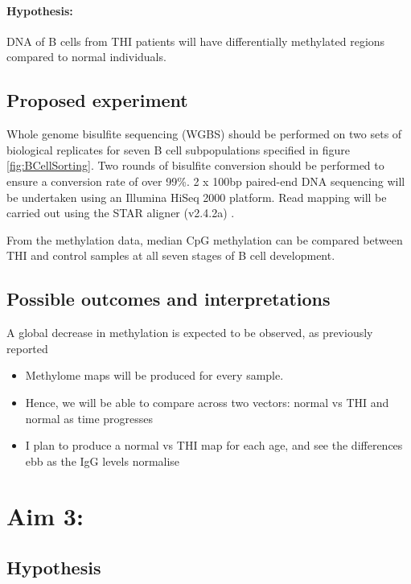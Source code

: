 \documentclass[12pt]{article}
\begin{document}
		\paragraph{Hypothesis:} DNA of B cells from THI patients will have differentially methylated regions compared to normal individuals.
		
		\subsection{Proposed experiment}
		
		Whole genome bisulfite sequencing (WGBS) should be performed on two sets of biological replicates for seven B cell subpopulations specified in figure \ref{fig:BCellSorting}. 
		Two rounds of bisulfite conversion should be performed to ensure a conversion rate of over 99\%.
		2 x 100bp paired-end DNA sequencing will be undertaken using an Illumina HiSeq 2000 platform. 
		Read mapping will be carried out using the STAR aligner (v2.4.2a) \citep{Dobin13}.
		
		From the methylation data, median CpG methylation can be compared between THI and control samples at all seven stages of B cell development. 
		
		
		\subsection{Possible outcomes and interpretations}		
		
		A global decrease in methylation is expected to be observed, as previously reported
		\citep{Kulis15,Lai13,Kulis12,Shaknovich11} 
			\begin{itemize}
				\item Methylome maps will be produced for every sample. 
				\item Hence, we will be able to compare across two vectors: normal vs THI and normal as time progresses
				\item I plan to produce a normal vs THI map for each age, and see the differences ebb as the IgG levels normalise
			\end{itemize}
		
	\section{Aim 3:}
	
		\subsection{Hypothesis}
		
\end{document}
